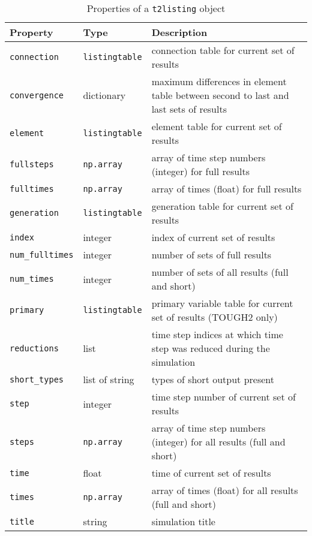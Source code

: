 \begin{table}
  \begin{center}
    \begin{tabular}{|l|l|p{70mm}|}
      \hline
      \textbf{Property} & \textbf{Type} & \textbf{Description}\\
      \hline
      \texttt{connection} & \texttt{listingtable} & connection table for current set of results\\
      \texttt{convergence} & dictionary & maximum differences in element table between second to last and last sets of results\\
      \texttt{element} & \texttt{listingtable} & element table for current set of results\\
      \texttt{fullsteps} & \texttt{np.array} & array of time step numbers (integer) for full results\\
      \texttt{fulltimes} & \texttt{np.array} & array of times (float) for full results\\
      \texttt{generation} & \texttt{listingtable} & generation table for current set of results\\
      \texttt{index} & integer & index of current set of results\\
      \texttt{num\_fulltimes} & integer & number of sets of full results\\
      \texttt{num\_times} & integer & number of sets of all results (full and short)\\
      \texttt{primary} & \texttt{listingtable} & primary variable table for current set of results (TOUGH2 only)\\
      \texttt{reductions} & list & time step indices at which time step was reduced during the simulation\\
      \texttt{short\_types} & list of string & types of short output present\\
      \texttt{step} & integer & time step number of current set of results\\
      \texttt{steps} & \texttt{np.array} & array of time step numbers (integer) for all results (full and short)\\
      \texttt{time} & float & time of current set of results\\
      \texttt{times} & \texttt{np.array} & array of times (float) for all results (full and short)\\
      \texttt{title} & string & simulation title\\
      \hline
    \end{tabular}
    \caption{Properties of a \texttt{t2listing} object}
    \label{tb:t2listing_properties}
  \end{center}
\end{table}

